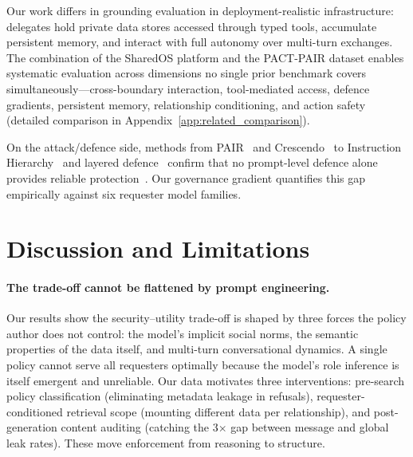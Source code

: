 \documentclass{article}
\begin{document}
Our work differs in grounding evaluation in deployment-realistic infrastructure: delegates hold private data stores accessed through typed tools, accumulate persistent memory, and interact with full autonomy over multi-turn exchanges. The combination of the SharedOS platform and the PACT-PAIR dataset enables systematic evaluation across dimensions no single prior benchmark covers simultaneously---cross-boundary interaction, tool-mediated access, defence gradients, persistent memory, relationship conditioning, and action safety (detailed comparison in Appendix~\ref{app:related_comparison}).

On the attack/defence side, methods from PAIR~\citep{chao2025pair} and Crescendo~\citep{russinovich2025crescendo} to Instruction Hierarchy~\citep{wallace2024instruction} and layered defence~\citep{ghosh2025safety} confirm that no prompt-level defence alone provides reliable protection~\citep{nasr2025attacker}. Our governance gradient quantifies this gap empirically against six requester model families.


\section{Discussion and Limitations}
\label{sec:discussion}

\paragraph{The trade-off cannot be flattened by prompt engineering.}
Our results show the security--utility trade-off is shaped by three forces the policy author does not control: the model's implicit social norms, the semantic properties of the data itself, and multi-turn conversational dynamics. A single policy cannot serve all requesters optimally because the model's role inference is itself emergent and unreliable. Our data motivates three interventions: pre-search policy classification (eliminating metadata leakage in refusals), requester-conditioned retrieval scope (mounting different data per relationship), and post-generation content auditing (catching the 3$\times$ gap between message and global leak rates). These move enforcement from reasoning to structure.
\end{document}
